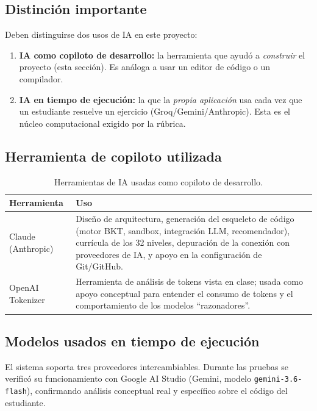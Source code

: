 \documentclass[11pt,letterpaper]{article}
\begin{document}
\subsection{Distinción importante}
Deben distinguirse dos usos de IA en este proyecto:
\begin{enumerate}[leftmargin=*]
  \item \textbf{IA como copiloto de desarrollo:} la herramienta que
  ayudó a \textit{construir} el proyecto (esta sección). Es análoga a
  usar un editor de código o un compilador.
  \item \textbf{IA en tiempo de ejecución:} la que la \textit{propia
  aplicación} usa cada vez que un estudiante resuelve un ejercicio
  (Groq/Gemini/Anthropic). Esta es el núcleo computacional exigido por
  la rúbrica.
\end{enumerate}

\subsection{Herramienta de copiloto utilizada}
\begin{table}[H]
\centering
\small
\begin{tabular}{@{}p{4cm}p{9cm}@{}}
\toprule
\textbf{Herramienta} & \textbf{Uso} \\
\midrule
Claude (Anthropic) & Diseño de arquitectura, generación del esqueleto
de código (motor BKT, sandbox, integración LLM, recomendador),
currícula de los 32 niveles, depuración de la conexión con proveedores
de IA, y apoyo en la configuración de Git/GitHub. \\
OpenAI Tokenizer & Herramienta de análisis de tokens vista en clase;
usada como apoyo conceptual para entender el consumo de tokens y el
comportamiento de los modelos ``razonadores''. \\
\bottomrule
\end{tabular}
\caption{Herramientas de IA usadas como copiloto de desarrollo.}
\end{table}

\subsection{Modelos usados en tiempo de ejecución}
El sistema soporta tres proveedores intercambiables. Durante las
pruebas se verificó su funcionamiento con Google AI Studio (Gemini,
modelo \texttt{gemini-3.6-flash}), confirmando análisis conceptual
real y específico sobre el código del estudiante.
\end{document}
